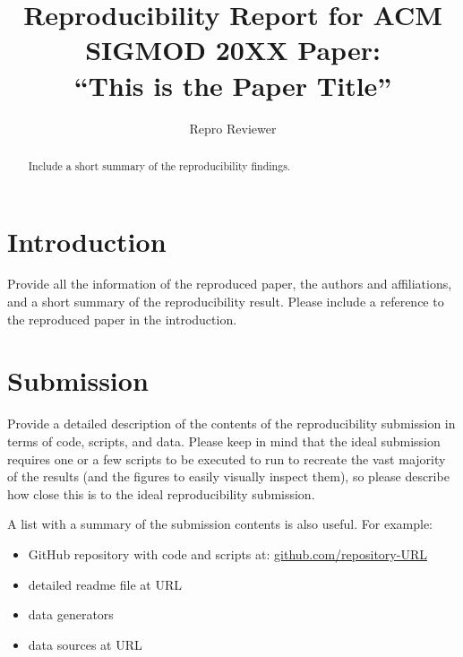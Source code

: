 \documentclass[sigconf]{acmart}
\begin{document}
\newcommand\papertitle[0]{This is the Paper Title}
\title[ARI Report for ``\papertitle'']{Reproducibility Report for ACM SIGMOD 20XX Paper:\\ ``\papertitle''}

\author{Repro Reviewer}



\begin{abstract}
Include a short summary of the reproducibility findings.
\end{abstract}




\maketitle


\section{Introduction}
Provide all the information of the reproduced paper, the authors and affiliations, and a short summary of the reproducibility result. Please include a reference to the reproduced paper in the introduction.

\section{Submission} 
Provide a detailed description of the contents of the reproducibility submission in terms of code, scripts, and data. Please keep in mind that the ideal submission requires one or a few scripts to be executed to run to recreate the vast majority of the results (and the figures to easily visually inspect them), so please describe how close this is to the ideal reproducibility submission. 

A list with a summary of the submission contents is also useful. For example:
\begin{itemize}
\item GitHub repository with code and scripts at: \url{github.com/repository-URL}
\item detailed readme file at URL
\item data generators
\item data sources at URL	
\end{itemize}
\end{document}
